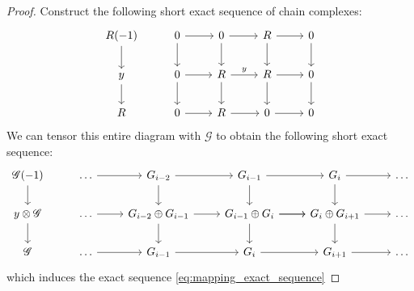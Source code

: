 \documentclass[12pt]{article}
\theoremstyle{plain}
\theoremstyle{definition}
\newcommand{\scr}[1]{\mathscr{#1}}
\begin{document}
\begin{proof}
Construct the following short exact sequence of chain complexes:
\begin{equation}
\begin{tikzcd}
R(-1)\arrow[d] & 0\arrow[r]\arrow[d] & 0\arrow[r]\arrow[d] & R\arrow[r]\arrow[d] & 0\arrow[d]\\
y\arrow[d] & 0\arrow[r]\arrow[d] & R\arrow[r,"{y}"]\arrow[d] & R\arrow[r]\arrow[d] & 0\arrow[d]\\
R &0\arrow[r] & R\arrow[r] & 0\arrow[r] & 0
\end{tikzcd}
\end{equation}
We can tensor this entire diagram with $\scr{G}$ to obtain the following short exact sequence:
\begin{equation}
\begin{tikzcd}
\scr{G}(-1)\arrow[d] & \hdots\arrow[r] & G_{i-2}\arrow[r]\arrow[d] & G_{i-1}\arrow[r]\arrow[d] & G_i\arrow[r]\arrow[d] & \hdots\\
y\otimes \scr{G}\arrow[d] & \hdots\arrow[r] & G_{i-2} \oplus G_{i-1}\arrow[r]\arrow[d] & G_{i-1} \oplus G_i\arrow[r]\arrow[d]\arrow[r] & G_{i} \oplus G_{i+1}\arrow[r]\arrow[d] & \hdots\\
\scr{G} & \hdots\arrow[r] & G_{i-1}\arrow[r] & G_i\arrow[r] & G_{i+1}\arrow[r] & \hdots
\end{tikzcd}
\end{equation}
which induces the exact sequence \eqref{eq:mapping_exact_sequence}
\end{proof}
\end{document}
